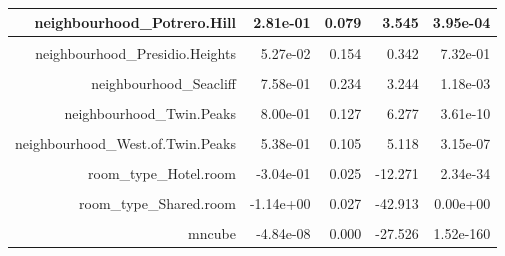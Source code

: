\documentclass[justified, 11pt]{scrartcl}\usepackage[]{graphicx}\usepackage[]{xcolor}
\newenvironment{knitrout}{}{} %
\begin{document}
\begin{knitrout}
\begin{table}
\begin{tabular}{r|r|r|r|r}
\hline
neighbourhood\_Potrero.Hill & 2.81e-01 & 0.079 & 3.545 & 3.95e-04\\
\hline
\cellcolor{gray!6}{neighbourhood\_Presidio} & \cellcolor{gray!6}{6.02e-01} & \cellcolor{gray!6}{0.245} & \cellcolor{gray!6}{2.455} & \cellcolor{gray!6}{1.41e-02}\\
\hline
neighbourhood\_Presidio.Heights & 5.27e-02 & 0.154 & 0.342 & 7.32e-01\\
\hline
\cellcolor{gray!6}{neighbourhood\_Russian.Hill} & \cellcolor{gray!6}{-5.77e-02} & \cellcolor{gray!6}{0.124} & \cellcolor{gray!6}{-0.464} & \cellcolor{gray!6}{6.43e-01}\\
\hline
neighbourhood\_Seacliff & 7.58e-01 & 0.234 & 3.244 & 1.18e-03\\
\hline
\cellcolor{gray!6}{neighbourhood\_South.of.Market} & \cellcolor{gray!6}{8.24e-02} & \cellcolor{gray!6}{0.087} & \cellcolor{gray!6}{0.944} & \cellcolor{gray!6}{3.45e-01}\\
\hline
neighbourhood\_Twin.Peaks & 8.00e-01 & 0.127 & 6.277 & 3.61e-10\\
\hline
\cellcolor{gray!6}{neighbourhood\_Visitacion.Valley} & \cellcolor{gray!6}{4.22e-01} & \cellcolor{gray!6}{0.097} & \cellcolor{gray!6}{4.350} & \cellcolor{gray!6}{1.38e-05}\\
\hline
neighbourhood\_West.of.Twin.Peaks & 5.38e-01 & 0.105 & 5.118 & 3.15e-07\\
\hline
\cellcolor{gray!6}{neighbourhood\_Western.Addition} & \cellcolor{gray!6}{3.11e-01} & \cellcolor{gray!6}{0.102} & \cellcolor{gray!6}{3.054} & \cellcolor{gray!6}{2.26e-03}\\
\hline
room\_type\_Hotel.room & -3.04e-01 & 0.025 & -12.271 & 2.34e-34\\
\hline
\cellcolor{gray!6}{room\_type\_Private.room} & \cellcolor{gray!6}{-6.03e-01} & \cellcolor{gray!6}{0.020} & \cellcolor{gray!6}{-30.578} & \cellcolor{gray!6}{5.93e-196}\\
\hline
room\_type\_Shared.room & -1.14e+00 & 0.027 & -42.913 & 0.00e+00\\
\hline
\cellcolor{gray!6}{mnsqd} & \cellcolor{gray!6}{6.55e-05} & \cellcolor{gray!6}{0.000} & \cellcolor{gray!6}{30.597} & \cellcolor{gray!6}{3.46e-196}\\
\hline
mncube & -4.84e-08 & 0.000 & -27.526 & 1.52e-160\\
\hline
\end{tabular}
\endgroup{}
\end{table}

\end{knitrout}
\normalsize

{}

\end{document}
